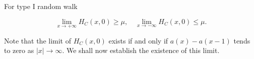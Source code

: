 For type I random walk

$$\lim_{x \to +\infty} H_C(x,0) \geq \mu, \quad \lim_{x \to -\infty} H_C(x,0) \leq \mu.$$

Note that the limit of $H_C(x,0)$ exists if and only if $a(x) - a(x - 1)$ tends to zero as $|x| \to \infty$. We shall now establish the existence of this limit.